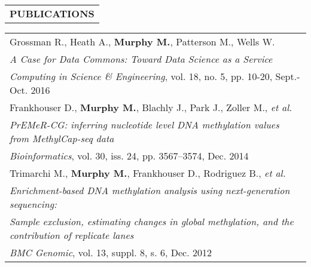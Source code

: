 \begin{tabularx}{\textwidth}{ L }
  \textbf{PUBLICATIONS} \\
\end{tabularx}

\begin{tabularx}{\textwidth}{ X }
    Grossman R., Heath A., \textbf{Murphy M.}, Patterson M., Wells W. \\
    \footnotesize\textit{A Case for Data Commons: Toward Data Science as a Service} \\
    \footnotesize{\textit{Computing in Science \& Engineering}, vol. 18, no. 5, pp. 10-20, Sept.-Oct. 2016} \\

    \vspace{1pt}

    Frankhouser D., \textbf{Murphy M.}, Blachly J., Park J., Zoller M., \textit{et al.} \\
    \footnotesize\textit{PrEMeR-CG: inferring nucleotide level DNA methylation values from MethylCap-seq data} \\
    \footnotesize{\textit{Bioinformatics}, vol. 30, iss. 24, pp. 3567--3574, Dec. 2014} \\

    \vspace{1pt}

    Trimarchi M., \textbf{Murphy M.}, Frankhouser D., Rodriguez B., \textit{et al.} \\
    \footnotesize\textit{Enrichment-based DNA methylation analysis using next-generation sequencing:} \\
    \footnotesize\textit{Sample exclusion, estimating changes in global methylation, and the contribution of replicate lanes} \\
    \footnotesize{\textit{BMC Genomic}, vol. 13, suppl. 8, s. 6, Dec. 2012} \\
\end{tabularx}

